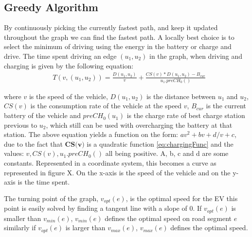 \subsection{Greedy Algorithm}
By continuously picking the currently fastest path, and keep it updated throughout the graph we can find the fastest path. A locally best choice is to select the minimum of driving using the energy in the battery or charge and drive.
The time spent driving an edge $(u_1, u_2)$ in the graph, when driving and charging is given by the following equation:
\begin{equation}
\begin{aligned}
 & T(v,(u_1, u_2)) = \frac{D(u_1, u_2)}{v} + \frac{CS(v) * D(u_1, u_2) - B_{cur}}{u_1.preCH_0()}
\end{aligned}
\end{equation}\label{eq:drivingAndCharging}


where $v$ is the speed of the vehicle, $D(u_1, u_2)$ is the distance between $u_1$ and $u_2$,
$CS(v)$ is the consumption rate of the vehicle at the speed $v$, $B_{cur}$ is the current battery of the vehicle and $preCH_0(u_1)$ is the charge rate of best charge station previous to $u_2$, which still can be used with overcharging the battery at that station. The above equation yields a function on the form: $av^2 + bv + d/v + c$, due to the fact that $\textbf{CS(v)}$ is a quadratic function \ref{eq:chargingFunc} and the values: $v, CS(v), u_1.preCH_0()$ all being positive.
A, b, c and d are some constants. Represented in a coordinate system, this becomes a curve as represented in figure X. On the x-axis is the speed of the vehicle and on the y-axis is the time spent.

The turning point of the graph, $v_{opt}(e)$, is the optimal speed for the EV this point is easily solved by finding a tangent line with a slope of 0. If $v_{opt}(e)$ is smaller than $v_{min}(e)$, $v_{min}(e)$ defines the optimal speed on road segment $e$ similarly if $v_{opt}(e)$ is larger than $v_{max}(e)$, $v_{max}(e)$ defines the optimal speed.  

